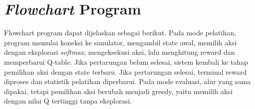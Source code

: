 \documentclass[11pt,a4paper,oneside]{report}
\begin{document}
\section{\textit{Flowchart} Program}
Flowchart program dapat dijelaskan sebagai berikut. Pada mode pelatihan, program memulai koneksi ke simulator, mengambil state awal, memilih aksi dengan eksplorasi \textit{softmax}, mengeksekusi aksi, lalu menghitung reward dan memperbarui Q-table. Jika pertarungan belum selesai, sistem kembali ke tahap pemilihan aksi dengan state terbaru. Jika pertarungan selesai, terminal reward diproses dan statistik pelatihan diperbarui. Pada mode evaluasi, alur yang sama dipakai, tetapi pemilihan aksi berubah menjadi greedy, yaitu memilih aksi dengan nilai Q tertinggi tanpa eksplorasi.

\end{document}
